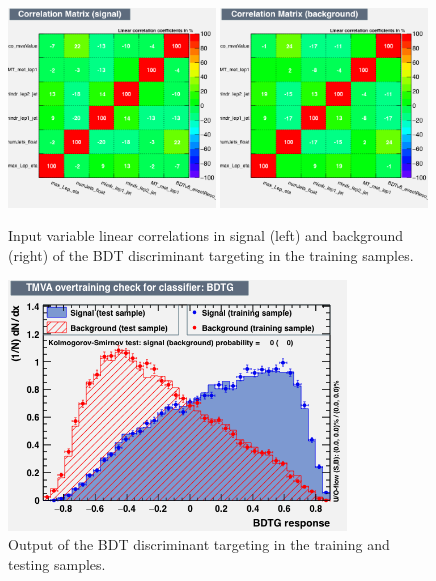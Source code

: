 \begin{figure}[hbtp]
 \begin{center}
   \includegraphics[width=0.49\textwidth]{ch9_figs/train_2lss_ttbar_bdtv8_value/CorrelationMatrixS.png}
   \includegraphics[width=0.49\textwidth]{ch9_figs/train_2lss_ttbar_bdtv8_value/CorrelationMatrixB.png}
   \caption[Input variable linear correlations of the BDT discriminant targeting \ttbar]{Input variable linear correlations in signal (left) and background (right)
     of the BDT discriminant targeting \ttbar in the training samples.}
   \label{fig:ttbarBdt_corrMatrix}
 \end{center}
\end{figure}

\begin{figure}[hbtp]
 \begin{center}
   \includegraphics[width=0.8\textwidth]{ch9_figs/train_2lss_ttbar_bdtv8_value/overtrain_BDTG.png}
   \caption[Output of the BDT discriminant targeting \ttbar]{Output of the BDT discriminant targeting \ttbar in the training and testing samples.}
   \label{fig:ttbarBdt_score}
 \end{center}
\end{figure}


